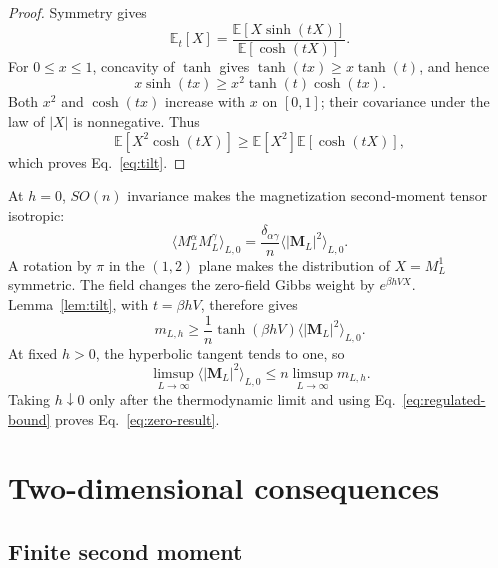 \documentclass[aps,prb,twocolumn,groupedaddress,amsmath,amssymb,
               superscriptaddress,nofootinbib,floatfix]{revtex4-2}
\theoremstyle{plain}
\theoremstyle{definition}
\newcommand{\Exp}{\mathbb E}
\begin{document}
\begin{proof}
Symmetry gives
\begin{equation}
 \Exp_t[X]
 =
 \frac{\Exp[X\sinh(tX)]}{\Exp[\cosh(tX)]}.
\end{equation}
For $0\le x\le1$, concavity of $\tanh$ gives
$\tanh(tx)\ge x\tanh(t)$, and hence
\begin{equation}
 x\sinh(tx)\ge x^2\tanh(t)\cosh(tx).
\end{equation}
Both $x^2$ and $\cosh(tx)$ increase with $x$ on $[0,1]$; their covariance
under the law of $|X|$ is nonnegative.  Thus
\begin{equation}
 \Exp[X^2\cosh(tX)]
 \ge\Exp[X^2]\Exp[\cosh(tX)],
\end{equation}
which proves Eq.~\eqref{eq:tilt}.
\end{proof}

At $h=0$, $SO(n)$ invariance makes the magnetization second-moment tensor
isotropic:
\begin{equation}
 \langle M_L^\alpha M_L^\gamma\rangle_{L,0}
 =
 \frac{\delta_{\alpha\gamma}}{n}
 \langle|\bm M_L|^2\rangle_{L,0}.                      \label{eq:isotropic-M2}
\end{equation}
A rotation by $\pi$ in the $(1,2)$ plane makes the distribution of
$X=M_L^1$ symmetric.  The field changes the zero-field Gibbs weight by
$e^{\beta hVX}$.  Lemma~\ref{lem:tilt}, with $t=\beta hV$, therefore gives
\begin{equation}
 m_{L,h}
 \ge
 \frac1n\tanh(\beta hV)
 \langle|\bm M_L|^2\rangle_{L,0}.                      \label{eq:bridge}
\end{equation}
At fixed $h>0$, the hyperbolic tangent tends to one, so
\begin{equation}
 \limsup_{L\to\infty}
 \langle|\bm M_L|^2\rangle_{L,0}
 \le n\limsup_{L\to\infty}m_{L,h}.                    \label{eq:bridge-limit}
\end{equation}
Taking $h\downarrow0$ only after the thermodynamic limit and using
Eq.~\eqref{eq:regulated-bound} proves Eq.~\eqref{eq:zero-result}.

\section{Two-dimensional consequences}
\label{sec:2d}

\subsection{Finite second moment}
\end{document}
